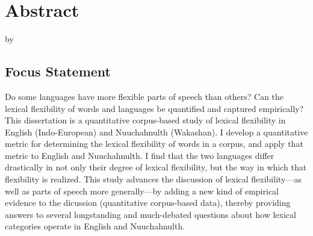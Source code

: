 \section*{Abstract}
\label{sec:abstract}

\begin{center}

  \doctitle

  by

  \theauthor

\end{center}

\subsection*{Focus Statement}

Do some languages have more flexible parts of speech than others? Can the lexical flexibility of words and languages be quantified and captured empirically? This dissertation is a quantitative corpus-based study of lexical flexibility in English (Indo-European) and Nuuchahnulth (Wakashan). I develop a quantitative metric for determining the lexical flexibility of words in a corpus, and apply that metric to English and Nuuchahnulth. I find that the two languages differ drastically in not only their degree of lexical flexibility, but the way in which that flexibility is realized. This study advances the discussion of lexical flexibility---as well as parts of speech more generally---by adding a new kind of empirical evidence to the dicussion (quantitative corpus-based data), thereby providing answers to  several longstanding and much-debated questions about how lexical categories operate in English and Nuuchahnulth.

